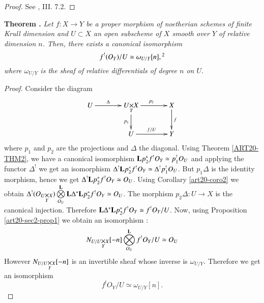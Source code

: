 \begin{proof}
See \cite{art20-key1}, III. 7.2.
\end{proof}

\medskip
\noindent
{\bf Theorem .\label{art20-thm3}}
{\em Let $f:X\to Y$ be a proper morphism of noetherian schemes of finite Krull dimension and $U\subset X$ an open subscheme of $X$ smooth over $Y$ of relative dimension $n$. Then, there exists a canonical isomorphism}
$$
f^{!}(O_{Y})/U\simeq \omega_{U/Y}[n],\footnotemark[2]
$$
{\em where $\omega_{U/Y}$ is the sheaf of relative differentials of degree $n$ on $U$.}
\smallskip

\begin{proof}
Consider the diagram
\[
\xymatrix@C=1.3cm{
U\ar[r]^-{\Delta} & \fprod{U}{X}{Y}\ar[d]_-{p_{1}}\ar[r]^{p_{2}} & X\ar[d]^{f}\\
 & U\ar[r]^-{f/U} & Y
}
\]\pageoriginale
where $p_{1}$ and $p_{2}$ are the projections and $\Delta$ the diagonal. Using Theorem \ref{ART20-THM2}, we have a canonical isomorphism $\mathbf{L} p^{*}_{2}f^{!}O_{Y}\simeq p^{!}_{1}O_{U}$ and applying the functor $\Delta^{!}$ we get an isomorphism $\Delta^{!}\mathbf{L} p^{*}_{2}f^{!}O_{Y}\simeq \Delta^{!}p^{!}_{1}O_{U}$. But $p_{1}\Delta$ is the identity morphism, hence we get $\Delta^{!}\mathbf{L} p^{*}_{2}f^{!}O_{Y}\simeq O_{U}$. Using Corollary \ref{art20-coro2} we obtain $\Delta^{!}(O_{\fprod{U}{X}{Y}})\bigotimes\limits^{\bfL}_{O_{U}}\bfL\Delta^{*}\bfL p^{*}_{2}f^{!}O_{Y}\simeq O_{U}$. The morphism $p_{2}\Delta  : U\to X$ is the canonical injection. Therefore $\mathbf{L} \Delta^{*}\mathbf{L} p^{*}_{2}f^{!}O_{Y}\simeq f^{!}O_{Y}/U$. Now, using Proposition \ref{art20-sec2-prop1} we obtain an isomorphism :
$$
N_{\fprod{U/U}{X}{Y}}[-n]\bigotimes\limits^{\bfL}_{O_{U}}f^{!}O_{Y}/U\simeq O_{U}
$$
However $N_{\fprod{U/U}{X}{Y}}[-n]$ is an invertible sheaf whose inverse is $\omega_{U/Y}$. Therefore we get an isomorphism
$$
f^{!}O_{Y}/U\simeq \omega_{U/Y}[n].
$$


\end{proof}
